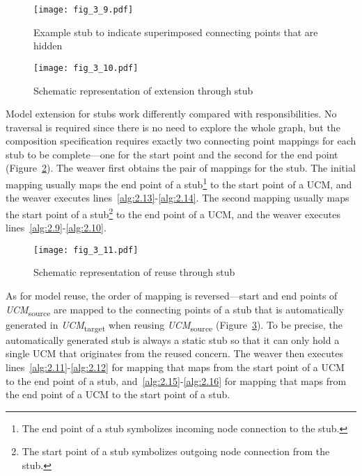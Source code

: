 \begin{figure}
	\centering
	\texttt{[image: fig\_3\_9.pdf]}
	\caption{Example stub to indicate superimposed connecting points that are hidden}
	\label{fig:3.9}
\end{figure}

\begin{figure}[h]
	\centering
	\texttt{[image: fig\_3\_10.pdf]}
	\caption{Schematic representation of extension through stub}
	\label{fig:3.10}
\end{figure}

Model extension for stubs work differently compared with responsibilities. No traversal is required since there is no need to explore the whole graph, but the composition specification requires exactly two connecting point mappings for each stub to be complete---one for the start point and the second for the end point (Figure~\ref{fig:3.10}). The weaver first obtains the pair of mappings for the stub. The initial mapping usually maps the end point of a stub\footnote{The end point of a stub symbolizes incoming node connection to the stub.} to the start point of a UCM, and the weaver executes lines~\ref{alg:2.13}-\ref{alg:2.14}. The second mapping usually maps the start point of a stub\footnote{The start point of a stub symbolizes outgoing node connection from the stub.} to the end point of a UCM, and the weaver executes lines~\ref{alg:2.9}-\ref{alg:2.10}.

\begin{figure}
	\centering
	\texttt{[image: fig\_3\_11.pdf]}
	\caption{Schematic representation of reuse through stub}
	\label{fig:3.11}
\end{figure}

As for model reuse, the order of mapping is reversed---start and end points of \emph{UCM}\textsubscript{source} are mapped to the connecting points of a stub that is automatically generated in \emph{UCM}\textsubscript{target} when reusing \emph{UCM}\textsubscript{source} (Figure~\ref{fig:3.11}). To be precise, the automatically generated stub is always a static stub so that it can only hold a single UCM that originates from the reused concern. The weaver then executes lines~\ref{alg:2.11}-\ref{alg:2.12} for mapping that maps from the start point of a UCM to the end point of a stub, and~\ref{alg:2.15}-\ref{alg:2.16} for mapping that maps from the end point of a UCM to the start point of a stub.

